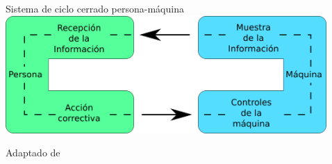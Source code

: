 \begin{frame}

  \begin{columns}
    \begin{column}{0.45\textwidth}
      \begin{block}{Sistema de ciclo cerrado persona-m\'aquina}
        \includegraphics[width=\linewidth]{tikz/01-03-loop-persona-maquina.png}

        {\tiny Adaptado de \cite{bhandari2010design}}
      \end{block}
    \end{column}

    \begin{column}{0.05\textwidth}
    \end{column}

    \begin{column}{0.45\textwidth}

    \end{column}
      
  \end{columns}

\end{frame}
